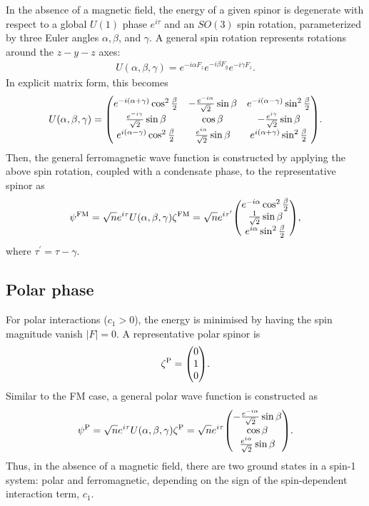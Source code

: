 In the absence of a magnetic field, the energy of a given spinor is degenerate
with respect to a global \(U(1)\) phase \(e^{i\tau}\) and an \(SO(3)\) spin
rotation, parameterized by three Euler angles \(\alpha, \beta \),
and \(\gamma \).
A general spin rotation represents rotations around the \(z-y-z\) axes:
\begin{align}\label{eq: spin-rotation-exponential}
    U(\alpha, \beta, \gamma) = e^{-i\alpha F_z}e^{-i\beta F_y}e^{-i\gamma F_z}.
\end{align}
In explicit matrix form, this becomes
\begin{align}
    U(\alpha, \beta, \gamma) = \mqty(
    e^{-i(\alpha + \gamma)}\cos^2\frac{\beta}{2} &
    -\frac{e^{-i\alpha}}{\sqrt{2}}\sin\beta &
    e^{-i(\alpha - \gamma)}\sin^2\frac{\beta}{2} \\
    \frac{e^{-i\gamma}}{\sqrt{2}}\sin\beta &
    \cos\beta &
    -\frac{e^{i\gamma}}{\sqrt{2}}\sin\beta \\
    e^{i(\alpha - \gamma)}\cos^2\frac{\beta}{2} &
    \frac{e^{i\alpha}}{\sqrt{2}}\sin\beta &
    e^{i(\alpha + \gamma)}\sin^2\frac{\beta}{2}
    ).
\end{align}
Then, the general ferromagnetic wave function is constructed by applying the
above spin rotation, coupled with a condensate phase, to the representative
spinor as
\begin{align}\label{eq: FM-representative-spinor}
    \psi^\mathrm{FM} =
    \sqrt{n}e^{i\tau}U(\alpha, \beta, \gamma)\zeta^\mathrm{FM} =
    \sqrt{n}e^{i\tau^\prime}\mqty(
    e^{-i\alpha}\cos^2\frac{\beta}{2} \\
    \frac{1}{\sqrt{2}}\sin\beta \\
    e^{i\alpha}\sin^2\frac{\beta}{2}
    ),
\end{align}
where \(\tau^\prime = \tau-\gamma \).

\subsection{Polar phase}
For polar interactions (\(c_1 > 0\)), the energy is minimised by having the
spin magnitude vanish \(|F|=0\).
A representative polar spinor is
\begin{equation}\label{eq: EAP-spinor}
    \zeta^\mathrm{P} = \mqty(0 \\ 1 \\ 0).
\end{equation}
Similar to the FM case, a general polar wave function is constructed as
\begin{equation}\label{eq: polar-representative-spinor}
    \psi^\mathrm{P} =
    \sqrt{n}e^{i\tau}U(\alpha, \beta, \gamma)\zeta^\mathrm{P} =
    \sqrt{n}e^{i\tau}\mqty(
    -\frac{e^{-i\alpha}}{\sqrt{2}}\sin\beta \\
    \cos\beta \\
    \frac{e^{i\alpha}}{\sqrt{2}}\sin\beta
    ).
\end{equation}
Thus, in the absence of a magnetic field, there are two ground states in a
spin-1 system: polar and ferromagnetic, depending on the sign of the
spin-dependent interaction term, \(c_1\).


